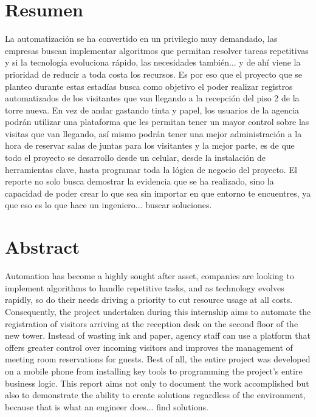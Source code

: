 \documentclass[12pt]{article}
\newcommand{\nasesorinstitucional}{Dr. Marco Aurelio Nuño-Maganda}
\begin{document}









\clearpage
\ClearWallPaper
\thispagestyle{fancy}
\section*{Resumen}
La automatización se ha convertido en un privilegio muy demandado, las empresas buscan implementar algoritmos que permitan resolver tareas repetitivas y si la tecnología evoluciona rápido, las necesidades también... y de ahí viene la prioridad de reducir a toda costa los recursos. Es por eso que el proyecto que se planteo durante estas estadías busca como objetivo el poder realizar registros automatizados de los visitantes que van llegando a la recepción del piso 2 de la torre nueva. En vez de andar gastando tinta y papel, los usuarios de la agencia podrán utilizar una plataforma que les permitan tener un mayor control sobre las visitas que van llegando, así mismo podrán tener una mejor administración a la hora de reservar salas de juntas para los visitantes y la mejor parte, es de que todo el proyecto se desarrollo desde un celular, desde la instalación de herramientas clave, hasta programar toda la lógica de negocio del proyecto. El reporte no solo busca demostrar la evidencia que se ha realizado, sino la capacidad de poder crear lo que sea sin importar en que entorno te encuentres, ya que eso es lo que hace un ingeniero... buscar soluciones.



\clearpage
\thispagestyle{fancy}
\section*{Abstract}
Automation has become a highly sought after asset, companies are looking to implement algorithms to handle repetitive tasks, and as technology evolves rapidly, so do their needs driving a priority to cut resource usage at all costs. Consequently, the project undertaken during this internship aims to automate the registration of visitors arriving at the reception desk on the second floor of the new tower. Instead of wasting ink and paper, agency staff can use a platform that offers greater control over incoming visitors and improves the management of meeting room reservations for guests. Best of all, the entire project was developed on a mobile phone from installing key tools to programming the project's entire business logic. This report aims not only to document the work accomplished but also to demonstrate the ability to create solutions regardless of the environment, because that is what an engineer does... find solutions.
\end{document}
